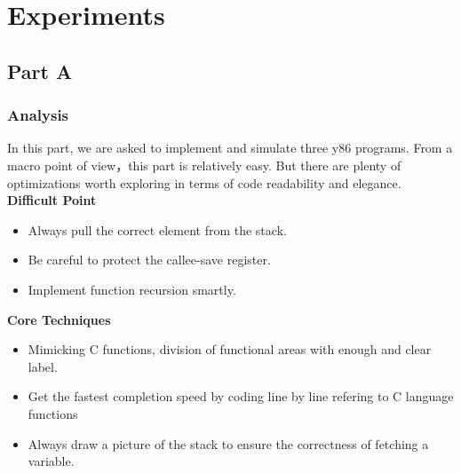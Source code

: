 \documentclass{article}
\begin{document}
\section{Experiments}
\subsection{Part A}
\subsubsection{Analysis}
In this part, we are asked to implement and simulate three y86 programs. 
From a macro point of view，this part is relatively easy. 
But there are plenty of optimizations worth exploring in terms of code readability and elegance.\\
\textbf{Difficult Point} 
\begin{itemize}
        \item Always pull the correct element from the stack.
        \item Be careful to protect the callee-save register.
        \item Implement function recursion smartly.
\end{itemize}
\textbf{Core Techniques}
\begin{itemize}
        \item Mimicking C functions, division of functional areas with enough and clear label.
        \item Get the fastest completion speed by coding line by line refering to C language functions
        \item Always draw a picture of the stack to ensure the correctness of fetching a variable.
\end{itemize}
\end{document}

